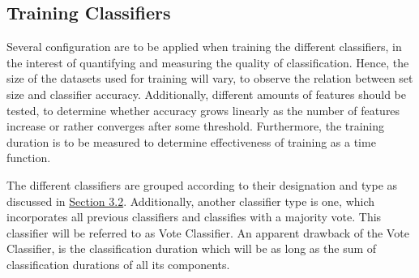 			
	\subsection{Training Classifiers}
		Several configuration are to be applied when training the different classifiers, in the interest of quantifying and measuring the quality of classification. Hence, the size of the datasets used for training will vary, to observe the relation between set size and classifier accuracy. Additionally, different amounts of features should be tested, to determine whether accuracy grows linearly as the number of features increase or rather converges after some threshold. Furthermore, the training duration is to be measured to determine effectiveness of training as a time function.
		
		\par
		
		The different classifiers are grouped according to their designation and type as discussed in \hyperref[classifer_types]{Section 3.2}. Additionally, another classifier type is one, which incorporates all previous classifiers and classifies with a majority vote. This classifier will be referred to as Vote Classifier. An apparent drawback of the Vote Classifier, is the classification duration which will be as long as the sum of classification durations of all its components.
		
		